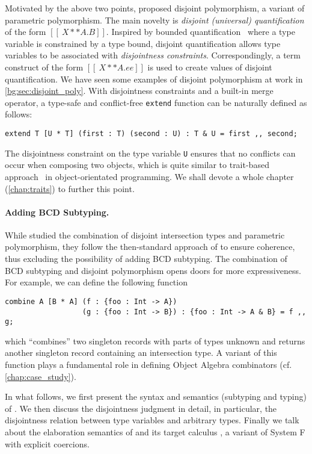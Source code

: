 Motivated by the above two points, \citet{alpuimdisjoint} proposed disjoint
polymorphism, a variant of parametric polymorphism. The main novelty is
\emph{disjoint (universal) quantification} of the form $[[ \ X ** A . B ]]$.
Inspired by bounded quantification~\citep{cardelli1994extension} where a type
variable is constrained by a type bound, disjoint quantification allows type
variables to be associated with \emph{disjointness constraints}.
Correspondingly, a term construct of the form $[[ \ X ** A. ee ]]$ is used to
create values of disjoint quantification. We have seen some examples of disjoint
polymorphism at work in \cref{bg:sec:disjoint_poly}. With disjointness constraints
and a built-in merge operator, a type-safe and conflict-free \lstinline{extend}
function can be naturally defined as follows:
\begin{lstlisting}
extend T [U * T] (first : T) (second : U) : T & U = first ,, second;
\end{lstlisting}
The disjointness constraint on the type variable \lstinline{U} ensures that no
conflicts can occur when composing two objects, which is quite similar to
trait-based approach~\citep{scharli2003traits} in object-orientated programming.
We shall devote a whole chapter (\cref{chap:traits}) to further this point.


\paragraph{Adding BCD Subtyping.}

While \citet{alpuimdisjoint} studied the combination of disjoint intersection
types and parametric polymorphism, they follow the then-standard approach
of \citet{oliveira2016disjoint} to ensure coherence, thus excluding the
possibility of adding BCD subtyping. The combination of BCD subtyping and
disjoint polymorphism opens doors for more expressiveness. For example, we can
define the following function
\begin{lstlisting}
combine A [B * A] (f : {foo : Int -> A})
                  (g : {foo : Int -> B}) : {foo : Int -> A & B} = f ,, g;
\end{lstlisting}
which ``combines'' two singleton records with parts of types unknown and returns
another singleton record containing an intersection type. A variant of this
function plays a fundamental role in defining Object Algebra combinators (cf.
\cref{chap:case_study}).




In what follows, we first present the syntax and semantics (subtyping and
typing) of \fnamee. We then discuss the disjointness judgment in detail, in
particular, the disjointness relation between type variables and arbitrary
types. Finally we talk about the elaboration semantics of \fnamee and its target
calculus \tnamee, a variant of System F with explicit coercions.



